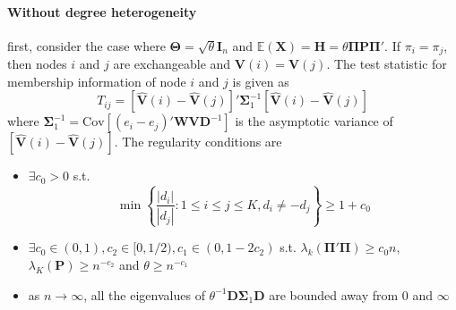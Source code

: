 \documentclass[twoside]{article}
\begin{document}
\paragraph*{Without degree heterogeneity} first, consider the case where $\boldsymbol{\Theta}=\sqrt{\theta}\mathbf{I}_n$ and $\mathbb{E}\left(\mathbf{X}\right) = \mathbf{H} = \theta\boldsymbol{\Pi}\mathbf{P}\boldsymbol{\Pi}'$. If $\pi_i = \pi_j$, then nodes $i$ and $j$ are exchangeable and $\mathbf{V}(i)=\mathbf{V}(j)$. The test statistic for membership information of node $i$ and $j$ is given as 
$$
T_{ij} = \left[\hat{\mathbf{V}}(i) - \hat{\mathbf{V}}(j)\right]'\boldsymbol{\Sigma}_1^{-1} \left[\hat{\mathbf{V}}(i) - \hat{\mathbf{V}}(j)\right]
$$
where $\boldsymbol{\Sigma}_1^{-1} = \mathrm{Cov}\left[(e_i - e_j)' \mathbf{WVD}^{-1}\right]$ is the asymptotic variance of $\left[\hat{\mathbf{V}}(i) - \hat{\mathbf{V}}(j)\right]$. The regularity conditions are 
\begin{itemize}
    \item[\textbf{C1}] $\exists c_0 >0$ s.t. $$ \min \left\{ \frac{\left\vert d_i \right\vert}{\left\vert d_j \right\vert}: 1\leq i\leq j\leq K, d_i\neq -d_j \right\} \geq 1+c_0 $$
    \item[\textbf{C2}] $\exists c_0\in (0,1), c_2\in [0,1/2), c_1\in (0,1-2c_2)$ s.t. $\lambda_k\left(\boldsymbol{\Pi'\Pi}\right) \geq c_0 n$, $\lambda_K(\mathbf{P})\geq n^{-c_2}$ and $\theta \geq n^{-c_1}$
    \item[\textbf{C3}] as $n\rightarrow \infty$, all the eigenvalues of $\theta^{-1}\mathbf{D}\boldsymbol{\Sigma}_1\mathbf{D}$ are bounded away from $0$ and $\infty$
\end{itemize}
\end{document}
